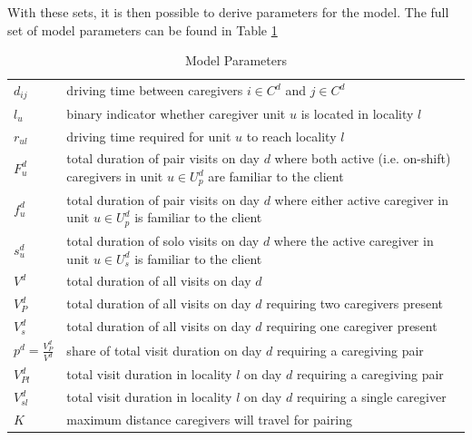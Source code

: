 \documentclass[11pt,twoside]{article}
\numberwithin{Theorem}{section}
\numberwithin{Definition}{section}
\numberwithin{Lemma}{section}
\numberwithin{Algorithm}{section}
\numberwithin{equation}{section}
\begin{document}
With these sets, it is then possible to derive parameters for the model. The full set of model parameters can be found in Table \ref{tab:paramstab}
\begin{table}[H]
	\caption{Model Parameters}
	\label{tab:paramstab}
	\begin{tabularx}{\textwidth}{l X}
		$d_{ij}$ & driving time between caregivers $i \in C^d$ and $j \in C^d$\\
		$l_u$ & binary indicator whether caregiver unit $u$ is located in locality $l$\\
		$r_{ul}$ & driving time required for unit $u$ to reach locality $l$\\
		$F_u^d$ & total duration of pair visits on day $d$ where both active (i.e. on-shift) caregivers in unit $u \in U_p^d$ are familiar to the client\\
		$f_u^d$ & total duration of pair visits on day $d$ where either active caregiver in unit $u \in U_p^d$ is familiar to the client\\
		$s_u^d$ & total duration of solo visits on day $d$ where the active caregiver in unit $u \in U_s^d$ is familiar to the client\\
		$V^d$ & total duration of all visits on day $d$\\
		$V_P^d$ & total duration of all visits on day $d$ requiring two caregivers present\\
		$V_s^d$ & total duration of all visits on day $d$ requiring one caregiver present\\
		$p^d = \frac{V_P^d}{V^d}$ & share of total visit duration on day $d$ requiring a caregiving pair\\
		$V_{Pl}^d$ & total visit duration in locality $l$ on day $d$ requiring a caregiving pair\\
		$V_{sl}^d$ & total visit duration in locality $l$ on day $d$ requiring a single caregiver\\
		$K$ & maximum distance caregivers will travel for pairing
	\end{tabularx}
\end{table}
\end{document}
